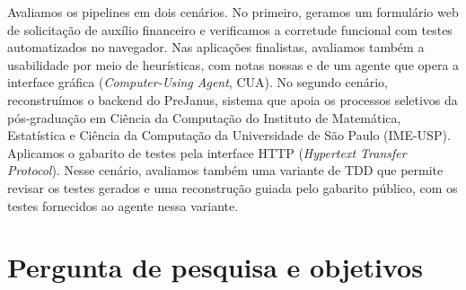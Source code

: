 \documentclass[a4paper,12pt,twoside,english,brazilian]{book}
\begin{document}
Avaliamos os pipelines em dois cenários. No primeiro, geramos um formulário
web de solicitação de auxílio financeiro e verificamos a corretude funcional
com testes automatizados no navegador. Nas aplicações finalistas, avaliamos
também a usabilidade por meio de heurísticas, com notas nossas e de um agente
que opera a interface gráfica (\emph{Computer-Using Agent}, CUA). No segundo
cenário, reconstruímos o backend do PreJanus, sistema que apoia os processos
seletivos da pós-graduação em Ciência da Computação do Instituto de Matemática,
Estatística e Ciência da Computação da Universidade de São Paulo (IME-USP).
Aplicamos o gabarito de testes pela interface HTTP (\emph{Hypertext Transfer
Protocol}). Nesse cenário, avaliamos também uma variante de TDD que permite
revisar os testes gerados e uma reconstrução guiada pelo gabarito público,
com os testes fornecidos ao agente nessa variante.



\section{Pergunta de pesquisa e objetivos}
\label{sec:pergunta-pesquisa}
\end{document}
